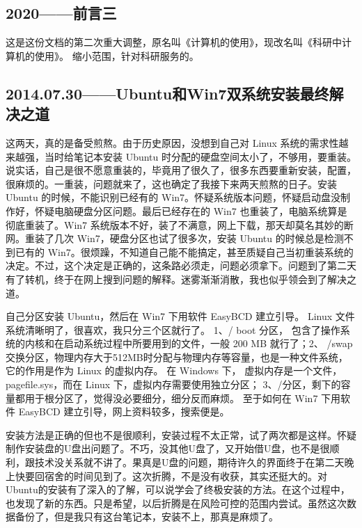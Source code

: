 \documentclass[cn,11pt,chinese,twoside]{elegantbook}
\begin{document}
\subsection*{2020——前言三}
这是这份文档的第二次重大调整，原名叫《计算机的使用》，现改名叫《科研中计算机的使用》。
缩小范围，针对科研服务的。



\subsection*{2014.07.30——Ubuntu和Win7双系统安装最终解决之道}
这两天，真的是备受煎熬。由于历史原因，没想到自己对 Linux 系统的需求性越来越强，当时给笔记本安装 Ubuntu 时分配的硬盘空间太小了，不够用，要重装。说实话，自己是很不愿意重装的，毕竟用了很久了，很多东西要重新安装，配置，很麻烦的。一重装，问题就来了，这也确定了我接下来两天煎熬的日子。安装 Ubuntu 的时候，不能识别已经有的 Win7。怀疑系统版本问题，怀疑启动盘没制作好，怀疑电脑硬盘分区问题。最后已经存在的 Win7 也重装了，电脑系统算是彻底重装了。Win7 系统版本不好，装了不满意，网上下载，那天却莫名其妙的断网。重装了几次 Win7，硬盘分区也试了很多次，安装 Ubuntu 的时候总是检测不到已有的 Win7。很烦躁，不知道自己能不能搞定，甚至质疑自己当初重装系统的决定。不过，这个决定是正确的，这条路必须走，问题必须拿下。问题到了第二天有了转机，终于在网上搜到问题的解释。迷雾渐渐消散，我也似乎领会到了解决之道。

自己分区安装 Ubuntu，然后在 Win7 下用软件 EasyBCD 建立引导。 Linux 文件系统清晰明了，很喜欢，我只分三个区就行了。 1、/ boot 分区， 包含了操作系统的内核和在启动系统过程中所要用到的文件，一般 200 MB 就行了；2、 /swap 交换分区，物理内存大于512MB时分配与物理内存等容量，也是一种文件系统，它的作用是作为 Linux 的虚拟内存。 在 Windows 下， 虚拟内存是一个文件， pagefile.sys，而在 Linux 下，虚拟内存需要使用独立分区； 3、/分区，剩下的容量都用于根分区了，觉得没必要细分，细分反而麻烦。 至于如何在 Win7 下用软件 EasyBCD 建立引导，网上资料较多，搜索便是。

安装方法是正确的但也不是很顺利，安装过程不太正常，试了两次都是这样。怀疑制作安装盘的U盘出问题了。不巧，没其他U盘了，又开始借U盘，也不是很顺利，跟技术没关系就不讲了。果真是U盘的问题，期待许久的界面终于在第二天晚上快要回宿舍的时间见到了。这次折腾，不是没有收获，其实还挺大的。对Ubuntu的安装有了深入的了解，可以说学会了终极安装的方法。在这个过程中，也发现了新的东西。只是希望，以后折腾是在风险可控的范围内尝试。虽然这次数据备份了，但是我只有这台笔记本，安装不上，那真是麻烦了。
\end{document}
